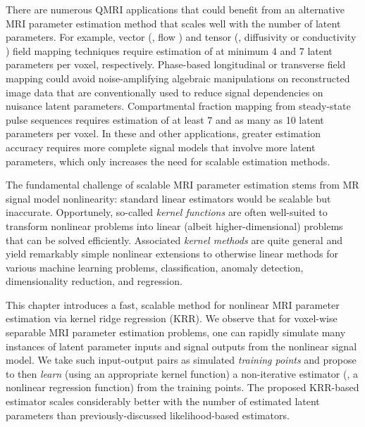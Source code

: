 There are numerous QMRI applications
that could benefit from an alternative MRI parameter estimation method
that scales well with the number of latent parameters.
For example,
vector (\eg, flow \cite{feinberg:85:mri})
and tensor 
(\eg, diffusivity \cite{bihan:01:dti} or conductivity \cite{tuch:01:ctm})
field mapping techniques
require estimation 
of at minimum 4 and 7 latent parameters per voxel,
respectively.
Phase-based longitudinal \cite{sekihara:85:nif} 
or transverse \cite{morrell:08:aps,sacolick:10:bmb} field mapping
could avoid noise-amplifying algebraic manipulations
on reconstructed image data
that are conventionally used
to reduce signal dependencies 
on nuisance latent parameters.
Compartmental fraction mapping \cite{mackay:94:ivv}
from steady-state pulse sequences
requires estimation of at least 7 \cite{deoni:08:gmt}
and as many as 10 \cite{deoni:13:oct}
latent parameters per voxel.
In these and other applications,
greater estimation accuracy
requires more complete signal models
that involve more latent parameters,
which only increases the need 
for scalable estimation methods.


The fundamental challenge 
of scalable MRI parameter estimation
stems from MR signal model nonlinearity:
standard linear estimators
would be scalable but inaccurate.
Opportunely,
so-called \emph{kernel functions} \cite{berg:84:hao}
are often well-suited 
to transform nonlinear problems
into linear (albeit higher-dimensional) problems
that can be solved efficiently. 
Associated \emph{kernel methods} \cite{scholkopf:01:agr}
are quite general
and yield remarkably simple nonlinear extensions
to otherwise linear methods
for various machine learning problems,
\eg classification,
anomaly detection,
dimensionality reduction,
and regression.

This chapter introduces a fast, scalable method 
for nonlinear MRI parameter estimation
via kernel ridge regression (KRR).
We observe that 
for voxel-wise separable MRI parameter estimation problems,
one can rapidly simulate many instances
of latent parameter inputs and signal outputs
from the nonlinear signal model.
We take such input-output pairs
as simulated \emph{training points}
and propose to then \emph{learn}
(using an appropriate kernel function)
a non-iterative estimator
(\ie, a nonlinear regression function)
from the training points.
The proposed KRR-based estimator scales considerably better
with the number of estimated latent parameters
than previously-discussed likelihood-based estimators.

